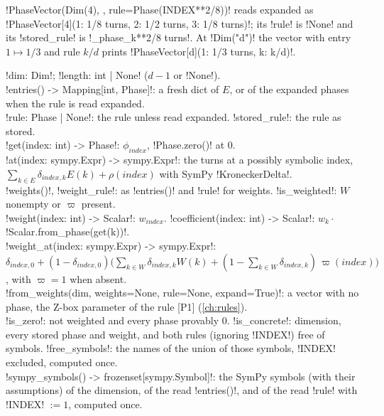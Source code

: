 \begin{example}
\py!PhaseVector(Dim(4), {}, rule=Phase(INDEX**2/8))! reads expanded as \code!PhaseVector[4]({1: 1/8 turns, 2: 1/2 turns, 3: 1/8 turns})!; its \py!rule! is \py!None! and its \py!stored_rule! is \code!_phase_k**2/8 turns!. At \py!Dim("d")! the vector with entry $1\mapsto 1/3$ and rule $k/d$ prints \code!PhaseVector[d]({1: 1/3 turns, k: k/d})!.
\end{example}

\begin{signature}
\py!dim: Dim!; \py!length: int | None! ($d-1$ or \py!None!).\\
\py!entries() -> Mapping[int, Phase]!: a fresh dict of $E$, or of the expanded phases when the rule is read expanded.\\
\py!rule: Phase | None!: the rule unless read expanded. \py!stored_rule!: the rule as stored.\\
\py!get(index: int) -> Phase!: $\phi_{\mathit{index}}$, \py!Phase.zero()! at $0$.\\
\py!at(index: sympy.Expr) -> sympy.Expr!: the turns at a possibly symbolic index, $\sum_{k\in E}\delta_{\mathit{index},k}E(k)+\rho(\mathit{index})$ with SymPy \py!KroneckerDelta!.\\
\py!weights()!, \py!weight_rule!: as \py!entries()! and \py!rule! for weights. \py!is_weighted!: $W$ nonempty or $\varpi$ present.\\
\py!weight(index: int) -> Scalar!: $w_{\mathit{index}}$. \py!coefficient(index: int) -> Scalar!: $w_k\cdot$\py!Scalar.from_phase(get(k))!.\\
\py!weight_at(index: sympy.Expr) -> sympy.Expr!: $\delta_{\mathit{index},0}+(1-\delta_{\mathit{index},0})\bigl(\sum_{k\in W}\delta_{\mathit{index},k}W(k)+(1-\sum_{k\in W}\delta_{\mathit{index},k})\,\varpi(\mathit{index})\bigr)$, with $\varpi=1$ when absent.\\
\py!from_weights(dim, weights=None, rule=None, expand=True)!: a vector with no phase, the Z-box parameter of the rule \textsc{[P1]} (\cref{ch:rules}).\\
\py!is_zero!: not weighted and every phase provably $0$. \py!is_concrete!: dimension, every stored phase and weight, and both rules (ignoring \py!INDEX!) free of symbols. \py!free_symbols!: the names of the union of those symbols, \py!INDEX! excluded, computed once.\\
\py!sympy_symbols() -> frozenset[sympy.Symbol]!: the SymPy symbols (with their assumptions) of the dimension, of the read \py!entries()!, and of the read \py!rule! with \py!INDEX! $:=1$, computed once.
\end{signature}

